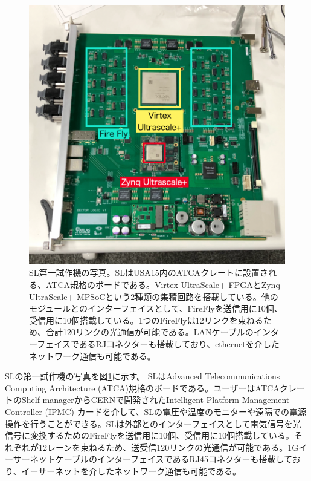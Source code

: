 \begin{figure} 
    \centering
    \includegraphics[width=14cm]{fig/Intro/TGC_SL.jpg}
    \caption[SL第一試作機の写真]{SL第一試作機の写真。SLはUSA15内のATCAクレートに設置される、ATCA規格のボードである。Virtex UltraScale+ FPGAとZynq UltraScale+ MPSoCという2種類の集積回路を搭載している。他のモジュールとのインターフェイスとして、FireFlyを送信用に10個、受信用に10個搭載している。1つのFireFlyは12リンクを束ねるため、合計120リンクの光通信が可能である。LANケーブルのインターフェイスであるRJコネクターも搭載しており、ethernetを介したネットワーク通信も可能である。}
    \label{TGC_SL}
\end{figure}

SLの第一試作機の写真を図\ref{TGC_SL}に示す。
SLはAdvanced Telecommunications Computing Architecture (ATCA)規格のボードである。ユーザーはATCAクレートのShelf managerからCERNで開発されたIntelligent Platform Management Controller  (IPMC) カードを介して、SLの電圧や温度のモニターや遠隔での電源操作を行うことができる。SLは外部とのインターフェイスとして電気信号を光信号に変換するためのFireFlyを送信用に10個、受信用に10個搭載している。それぞれが12レーンを束ねるため、送受信120リンクの光通信が可能である。1GイーサーネットケーブルのインターフェイスであるRJ45コネクターも搭載しており、イーサーネットを介したネットワーク通信も可能である。

